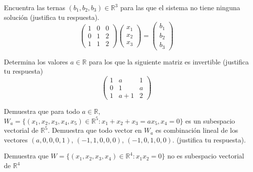 \documentclass[12pt,a4paper]{article}
\begin{document}
    \begin{mdframed}[style=mdbluebox,frametitle={Ejercicio 2}]
        Encuentra las ternas $(b_{1},b_{2},b_{3})\in\mathbb{R}^{3}$ para las que
        el sistema no tiene ninguna solución (justifica tu respuesta).
        \begin{equation*}
            \begin{pmatrix}
                1 & 0 & 0\\
                0 & 1 & 2\\
                1 & 1 & 2
            \end{pmatrix}
            \begin{pmatrix}
                x_{1}\\
                x_{2}\\
                x_{3}
            \end{pmatrix}
            =
            \begin{pmatrix}
                b_{1}\\
                b_{2}\\
                b_{3}
            \end{pmatrix}
        \end{equation*}
    \end{mdframed}

    \begin{mdframed}[style=mdbluebox,frametitle={Ejercicio 3}]
        Determina los valores $a\in\mathbb{R}$ para los que la siguiente
        matriz es invertible (justifica tu respuesta)
        \begin{equation*}
            \begin{pmatrix}
                1 & a & 1\\
                0 & 1 & a\\
                1 & a+1 & 2
            \end{pmatrix}
        \end{equation*}
    \end{mdframed}

    \begin{mdframed}[style=mdbluebox,frametitle={Ejercicio 4}]
        Demuestra que para todo $a\in\mathbb{R}$, $W_{a}=\{(x_{1},x_{2},x_{3},x_{4},x_{5})\in\mathbb{R}^{5}:x_{1}+x_{2}+x_{3}=ax_{5},x_{4}=0\}$
        es un subespacio vectorial de $\mathbb{R}^{5}$. Demuestra que todo
        vector en $W_{a}$ es combinación lineal de los vectores $(a,0,0,0,1)$,
        $(-1,1,0,0,0)$, $(-1,0,1,0,0)$. (justifica tu respuesta).
    \end{mdframed}

    \begin{mdframed}[style=mdbluebox,frametitle={Ejercicio 5}]
        Demuestra que $W=\{(x_{1},x_{2},x_{3},x_{4})\in\mathbb{R}^{4}:x_{1}x_{2}=0\}$
        no es subespacio vectorial de $\mathbb{R}^{4}$
    \end{mdframed}
\end{document}
